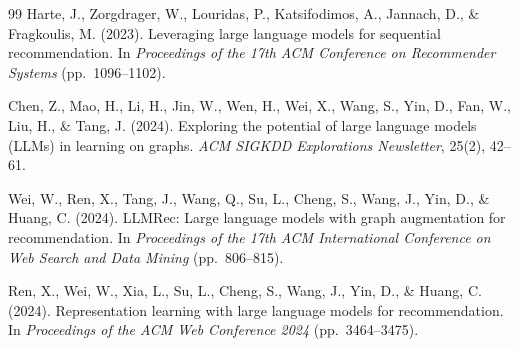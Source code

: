 \documentclass[11pt,a4paper]{article}
\newenvironment{mmblock}{}{}
\begin{document}
\begin{thebibliography}{99}
\begin{mmblock}
Harte, J., Zorgdrager, W., Louridas, P., Katsifodimos, A., Jannach, D., \& Fragkoulis, M. (2023).
Leveraging large language models for sequential recommendation.
In \textit{Proceedings of the 17th ACM Conference on Recommender Systems} (pp.\ 1096--1102).

Chen, Z., Mao, H., Li, H., Jin, W., Wen, H., Wei, X., Wang, S., Yin, D., Fan, W., Liu, H., \& Tang, J. (2024).
Exploring the potential of large language models ({LLMs}) in learning on graphs.
\textit{ACM SIGKDD Explorations Newsletter}, 25(2), 42--61.

Wei, W., Ren, X., Tang, J., Wang, Q., Su, L., Cheng, S., Wang, J., Yin, D., \& Huang, C. (2024).
{LLMRec}: Large language models with graph augmentation for recommendation.
In \textit{Proceedings of the 17th ACM International Conference on Web Search and Data Mining} (pp.\ 806--815).

Ren, X., Wei, W., Xia, L., Su, L., Cheng, S., Wang, J., Yin, D., \& Huang, C. (2024).
Representation learning with large language models for recommendation.
In \textit{Proceedings of the ACM Web Conference 2024} (pp.\ 3464--3475).
\end{mmblock}
\end{thebibliography}
\end{document}
